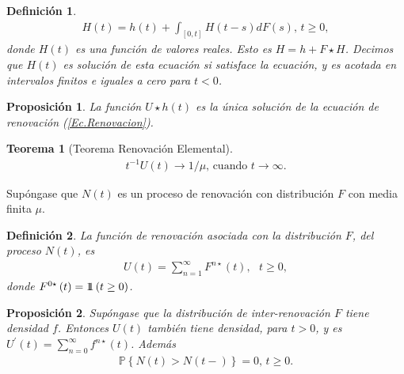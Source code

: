 \documentclass{article}
\newtheorem{Def}{Definición}[section]
\newtheorem{Teo}{Teorema}[section]
\newtheorem{Prop}{Proposición}[section]
\newcommand{\prob}{\mathbb{P}}
\newcommand{\indora}{\mbox{$1$\hspace{-0.8ex}$1$}}
\numberwithin{equation}{section}
\begin{document}
{\begin{Def}
\begin{eqnarray}%
H\left(t\right)=h\left(t\right)+\int_{\left[0,t\right]}H\left(t-s\right)dF\left(s\right)\textrm{,    }t\geq0,
\end{eqnarray}
donde $H\left(t\right)$ es una funci\'on de valores reales. Esto es $H=h+F\star H$. Decimos que $H\left(t\right)$ es soluci\'on de esta ecuaci\'on si satisface la ecuaci\'on, y es acotada en intervalos finitos e iguales a cero para $t<0$.
\end{Def}

\begin{Prop}
La funci\'on $U\star h\left(t\right)$ es la \'unica soluci\'on de la ecuaci\'on de renovaci\'on (\ref{Ec.Renovacion}).
\end{Prop}

\begin{Teo}[Teorema Renovaci\'on Elemental]
\begin{eqnarray*}
t^{-1}U\left(t\right)\rightarrow 1/\mu\textrm{,    cuando }t\rightarrow\infty.
\end{eqnarray*}
\end{Teo}

%
%


Sup\'ongase que $N\left(t\right)$ es un proceso de renovaci\'on con distribuci\'on $F$ con media finita $\mu$.

\begin{Def}
La funci\'on de renovaci\'on asociada con la distribuci\'on $F$, del proceso $N\left(t\right)$, es
\begin{eqnarray*}
U\left(t\right)=\sum_{n=1}^{\infty}F^{n\star}\left(t\right),\textrm{   }t\geq0,
\end{eqnarray*}
donde $F^{0\star}\left(t\right)=\indora\left(t\geq0\right)$.
\end{Def}


\begin{Prop}
Sup\'ongase que la distribuci\'on de inter-renovaci\'on $F$ tiene densidad $f$. Entonces $U\left(t\right)$ tambi\'en tiene densidad, para $t>0$, y es $U^{'}\left(t\right)=\sum_{n=0}^{\infty}f^{n\star}\left(t\right)$. Adem\'as
\begin{eqnarray*}
\prob\left\{N\left(t\right)>N\left(t-\right)\right\}=0\textrm{,   }t\geq0.
\end{eqnarray*}
\end{Prop}

}
\end{document}
